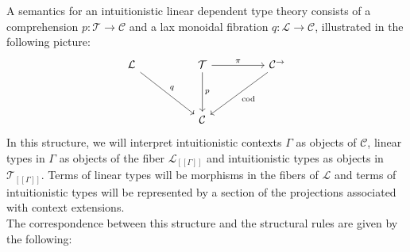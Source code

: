 A semantics for an intuitionistic linear dependent type theory consists of a comprehension $p : \mathcal{T} \to \mathcal{C}$ and a lax monoidal fibration $q : \mathcal{L} \to \mathcal{C}$, illustrated in the following picture:
\[
\ti
\mathcal{L} \ar[rd, "q"] & \mathcal{T} \ar[d, "p"] \ar[r, "\pi"] & \mathcal{C^\rightarrow} \ar[ld, "\text{cod}"]\\
& \mathcal{C}
\kz
\]
In this structure, we will interpret intuitionistic contexts $\Gamma$ as objects of $\mathcal{C}$, linear types in $\Gamma$ as objects of the fiber $\mathcal{L}_{[[\Gamma]]}$ and intuitionistic types as objects in $\mathcal{T}_{[[\Gamma]]}$. Terms of linear types will be morphisms in the fibers of $\mathcal{L}$ and terms of intuitionistic types will be represented by a section of the projections associated with context extensions.\\
The correspondence between this structure and the structural rules are given by the following:
